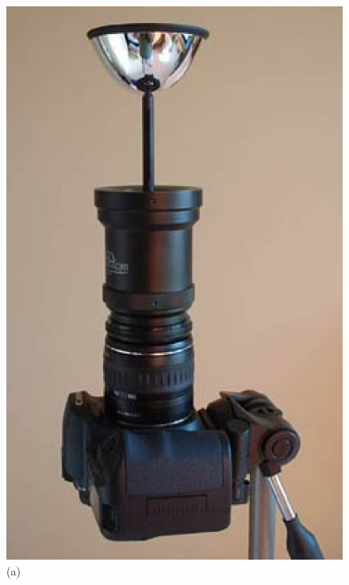 \documentclass{report}
\begin{document}
\begin{savenotes}
\begin{figure}
\centering
\begin{minipage}{0.457\textwidth}
\centering
\includegraphics[trim=0in 0in 0in 0in, clip=true, width=1\textwidth]{images/catacamera.eps} \\
(a)
\end{minipage}
\hspace{3pt}
\begin{minipage}{0.512\textwidth}
\centering

\end{minipage}
\end{figure}
\end{savenotes}
\end{document}
